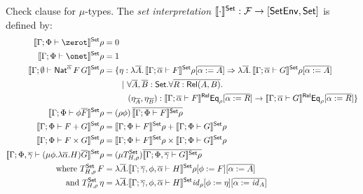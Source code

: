 \documentclass{lmcs}
\theoremstyle{plain}\newtheorem{satz}[thm]{Satz}
\newcommand{\F}{\mathcal{F}}
\newcommand{\set}{\mathsf{Set}}
\renewcommand{\id}{\mathit{id}}
\begin{document}
\begin{defi}\label{def:set-sem}
{\color{red} Check clause for $\mu$-types.} The {\em set
  interpretation} $\setsem{\cdot} : \F \to [\setenv, \set]$ is defined
by:
\begin{align*}
  \setsem{\Gamma;\Phi \vdash \zerot}\rho &= 0\\
  \setsem{\Gamma;\Phi \vdash \onet}\rho &= 1\\
  \setsem{\Gamma; \emptyset
    \vdash \Nat^{\ol{\alpha}}
    \,F\,G}\rho &= \{\eta : \lambda \ol{A}. \,\setsem{\Gamma;
    \ol{\alpha} \vdash
    F}\rho[\ol{\alpha := A}] 
      \Rightarrow \lambda \ol{A}.\,\setsem{\Gamma; 
        \ol{\alpha} \vdash G}\rho[\ol{\alpha := A}] \\ 
      &\hspace{0.3in}|~\forall \overline{A}, \overline{B} :
      \set. \forall \overline{R : \rel(A, B)}.\\ 
      &\hspace{0.4in}(\eta_{\overline{A}}, \eta_{\overline{B}})
      : \relsem{\Gamma; \ol{\alpha} \vdash F}\Eq_{\rho}[\ol{\alpha := R}]
      \rightarrow \relsem{\Gamma; \ol{\alpha} \vdash
        G}\Eq_{\rho}[\ol{\alpha := R}] \} \\
  \setsem{\Gamma;\Phi \vdash \phi\ol{F}}\rho &=
  (\rho\phi)\,\ol{\setsem{\Gamma;\Phi \vdash
    F}\rho}\\
  \setsem{\Gamma;\Phi \vdash F+G}\rho &=
  \setsem{\Gamma;\Phi \vdash F}\rho +
  \setsem{\Gamma;\Phi \vdash G}\rho\\
  \setsem{\Gamma;\Phi \vdash F\times G}\rho &=
  \setsem{\Gamma;\Phi \vdash F}\rho \times
  \setsem{\Gamma;\Phi \vdash G}\rho\\ 
  \setsem{\Gamma;\Phi,\ol\gamma \vdash (\mu \phi.\lambda
    \ol{\alpha}. H)\ol{G}}\rho &= (\mu
    T^\set_{H,\rho})\ol{\setsem{\Gamma;\Phi,\ol\gamma \vdash G}\rho}\\
    \text{where } T^\set_{H,\rho}\,F & = \lambda
  \ol{A}. \setsem{\Gamma;\ol\gamma,\phi, \ol{\alpha} \vdash
    H}\rho[\phi :=  F][\ol{\alpha := A}]\\
  \text{and } T^\set_{H,\rho}\,\eta &= \lambda
  \ol{A}. \setsem{\Gamma;\ol\gamma,\phi, \ol{\alpha} \vdash
    H}\id_\rho[\phi := \eta][\ol{\alpha := \id_{A}}]
\end{align*}
\end{defi}
%
\end{document}
